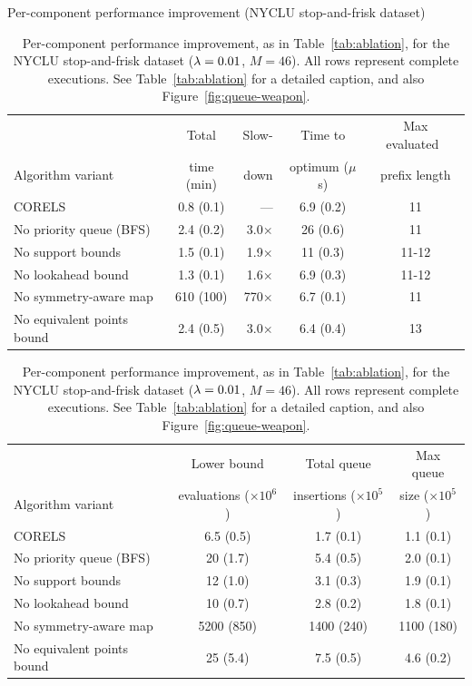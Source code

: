 \begin{table}[t!]
\begin{centering}
Per-component performance improvement (NYCLU stop-and-frisk dataset) \\
\end{centering}
\vspace{1mm}
\begin{tabular}{l | c  r | c | c}
& Total & Slow- & Time to & Max evaluated~ \\
Algorithm variant & time (min) & down & optimum ($\mu$s) & prefix length \\
\hline
CORELS & 0.8 (0.1) & --- & 6.9 (0.2) & 11 \\
No priority queue (BFS) & 2.4 (0.2) & 3.0$\times$ & 26 (0.6) & 11 \\
No support bounds & 1.5 (0.1) & 1.9$\times$ & 11 (0.3) & 11-12 \\
No lookahead bound & 1.3 (0.1) & 1.6$\times$ & 6.9 (0.3) & 11-12 \\
No symmetry-aware map & 610 (100) & 770$\times$ & 6.7 (0.1) & 11 \\
No equivalent points bound & 2.4 (0.5) & 3.0$\times$ & 6.4 (0.4) & 13 \\
\hline
\end{tabular}
\begin{tabular}{l | c | c | c}
\hline
 & Lower bound & Total queue &  Max queue \\
Algorithm variant & evaluations ($\times 10^6$) & insertions ($\times 10^5$) & size ($\times 10^5$) \\
\hline
CORELS & 6.5 (0.5) & 1.7 (0.1) & 1.1 (0.1) \\
No priority queue (BFS) & 20 (1.7) & 5.4 (0.5) & 2.0 (0.1) \\
No support bounds & 12 (1.0) & 3.1 (0.3) & 1.9 (0.1) \\
No lookahead bound & 10 (0.7) & 2.8 (0.2) & 1.8 (0.1) \\
No symmetry-aware map & 5200 (850) & 1400 (240) & 1100 (180) \\
No equivalent points bound & 25 (5.4) & 7.5 (0.5) & 4.6 (0.2) \\
\end{tabular}
\caption{Per-component performance improvement, as in Table~\ref{tab:ablation},
for the NYCLU stop-and-frisk dataset (${{\lambda} = 0.01}$, ${M = 46}$).
%
All rows represent complete executions.
%
See Table~\ref{tab:ablation} for a detailed caption,
and also Figure~\ref{fig:queue-weapon}.
}
\vspace{4mm}
\label{tab:ablation-weapon}
\end{table}

